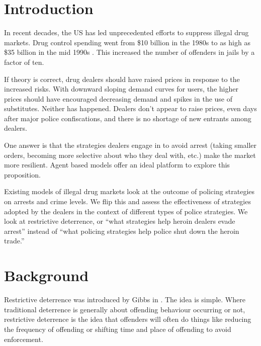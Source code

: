 \documentclass[runningheads,a4paper]{llncs}
\begin{document}
\section{Introduction}

In recent decades, the US has led unprecedented efforts to suppress illegal drug markets. Drug control spending went from \$10 billion in the 1980s to as high as \$35 billion in the mid 1990s \cite{bouchard}. This increased the number of offenders in jails by a factor of ten.



If theory is correct, drug dealers should have raised prices in response to the increased risks. With downward sloping demand curves for users, the higher prices should have encouraged decreasing demand and spikes in the use of substitutes. Neither  has happened. Dealers don't appear to raise prices, even days after major police confiscations, and there is no shortage of new entrants among dealers.


One answer is that the strategies dealers engage in to avoid arrest (taking smaller orders, becoming more selective about who they deal with, etc.) make the market more resilient. Agent based models offer an ideal platform to explore this proposition.

Existing models of illegal drug markets look at the outcome of policing strategies on arrests and crime levels. We flip this and assess the effectiveness of strategies adopted by the dealers in the context of different types of police strategies.
We look at restrictive deterrence, or “what strategies help heroin dealers evade arrest” instead of “what policing strategies help police shut down the heroin trade.”


\section{Background}

Restrictive deterrence was introduced by Gibbs in \cite{Gibbs 1975 paper}. The idea is simple. Where traditional deterrence is generally about offending behaviour occurring or not, restrictive deterrence is the idea that offenders will often do things like reducing the frequency of offending or shifting time and place of offending to avoid enforcement.
\end{document}
